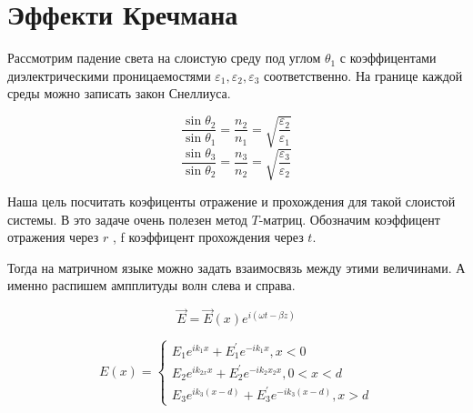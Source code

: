 \section{Эффекти Кречмана}
\begin{center}
\end{center}



Рассмотрим падение света на слоистую среду под углом $ 
\theta_1 $ с коэффицентами  диэлектрическими проницаемостями $ \varepsilon_1, \varepsilon_2, \varepsilon_3 $ соответственно. 
На границе каждой среды можно записать закон Снеллиуса.

	$$
	\frac{\sin{\theta_2}}{\sin{\theta_1}} = \frac{n_2}{n_1} =\sqrt{\frac{\varepsilon_{2}}{\varepsilon_1}}	$$
	$$
	\frac{{\sin\theta_3}}{\sin{\theta_2}} = \frac{n_3}{n_2} =\sqrt{\frac{\varepsilon_{3}}{\varepsilon_2}}	
	$$

Наша цель посчитать коэфиценты отражение и прохождения для такой слоистой системы. В это задаче очень полезен метод $ T $-матриц. Обозначим коэффицент отражения через $ r $ , f коэффицент прохождения через $ t $.

Тогда на матричном языке можно задать взаимосвязь между этими величинами. А именно распишем ампплитуды волн слева и справа.

$$\vec{E}=\vec{E}(x) e^{i(\omega t-\beta z)}$$

$$E(x)=\left\{\begin{array}{c}
E_{1} e^{i k_{1} x}+E_{1}^{\prime} e^{-i k_{1} x}, x<0 \\
E_{2} e^{i k_{2 x} x}+E_{2}^{\prime} e^{-i k_{2} x_{2} x}, 0<x<d \\
E_{3} e^{i k_{3}(x-d)}+E_{3}^{\prime} e^{-i k_{3}(x-d)}, x>d
\end{array}\right.$$

